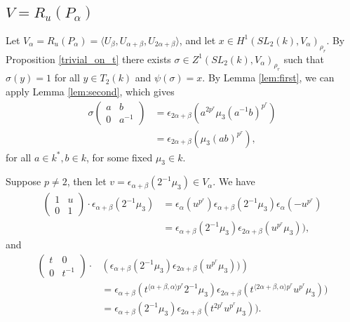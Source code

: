 \subsection{$V = R_u(P_\alpha)$}
\label{b2:alpha}

Let $V_\alpha=R_u(P_\alpha)=\langle U_\beta, U_{\alpha + \beta}, U_{2\alpha + \beta} \rangle$, and let $x\in H^1(SL_2(k), V_\alpha)_{\rho_r}$. By Proposition \ref{trivial_on_t} there exists $\sigma\in Z^1(SL_2(k), V_\alpha)_{\rho_r}$ such that $\sigma(y) = 1$ for all $y\in T_2(k)$ and $\psi(\sigma) = x$. By Lemma \ref{lem:first}, we can apply Lemma \ref{lem:second}, which gives
\begin{align*}
	\sigma\left(\begin{matrix}a & b\\0 & a^{-1}\end{matrix}\right) &= \epsilon_{2\alpha+\beta}\left(a^{2p^r}\mu_3(a^{-1}b)^{p^r}\right) \\
		&= \epsilon_{2\alpha+\beta}\left(\mu_3(ab)^{p^r}\right),
\end{align*}
for all $a\in k^*, b\in k$, for some fixed $\mu_3\in k$.

Suppose $p\neq 2$, then let $v = \epsilon_{\alpha+\beta}(2^{-1}\mu_3)\in V_\alpha$. We have
\begin{align*}
	\left(\begin{matrix}1 & u\\0 & 1\end{matrix}\right) \cdot \epsilon_{\alpha+\beta}(2^{-1}\mu_3) &=
		\epsilon_\alpha(u^{p^r})\epsilon_{\alpha+\beta}(2^{-1}\mu_3)\epsilon_\alpha(-u^{p^r}) \\
		&= \epsilon_{\alpha+\beta}(2^{-1}\mu_3)\epsilon_{2\alpha+\beta}(u^{p^r}\mu_3)),
\end{align*}
and
\begin{align*}
	\left(\begin{matrix}t & 0\\0 & t^{-1}\end{matrix}\right)\cdot&
		\left(\epsilon_{\alpha+\beta}(2^{-1}\mu_3)\epsilon_{2\alpha+\beta}(u^{p^r}\mu_3))\right)\\
		&= \epsilon_{\alpha+\beta}(t^{\langle\alpha+\beta,\alpha\rangle p^r}2^{-1}\mu_3)\epsilon_{2\alpha+\beta}(t^{\langle 2\alpha+\beta,\alpha\rangle p^r}u^{p^r}\mu_3)) \\
		&= \epsilon_{\alpha+\beta}(2^{-1}\mu_3)\epsilon_{2\alpha+\beta}(t^{2 p^r}u^{p^r}\mu_3)).
\end{align*}

